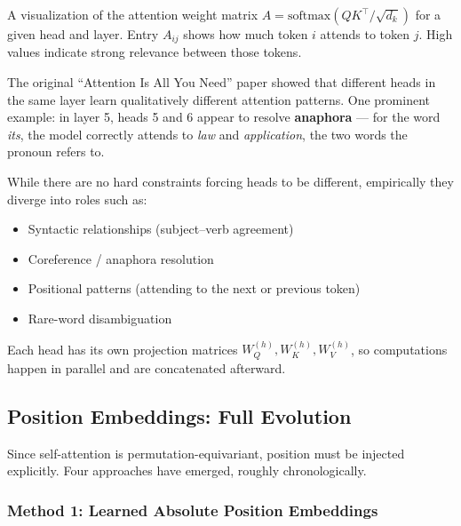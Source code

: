 \documentclass[11pt, a4paper]{article}
\begin{document}
\begin{defbox}
A visualization of the attention weight matrix $A = \text{softmax}(QK^\top / \sqrt{d_k})$ for a given head and layer. Entry $A_{ij}$ shows how much token $i$ attends to token $j$. High values indicate strong relevance between those tokens.
\end{defbox}

The original ``Attention Is All You Need'' paper showed that different heads in the same layer learn qualitatively different attention patterns. One prominent example: in layer 5, heads 5 and 6 appear to resolve \textbf{anaphora} --- for the word \textit{its}, the model correctly attends to \textit{law} and \textit{application}, the two words the pronoun refers to.

\begin{notebox}
While there are no hard constraints forcing heads to be different, empirically they diverge into roles such as:
\begin{itemize}[leftmargin=1.5em]
  \item Syntactic relationships (subject--verb agreement)
  \item Coreference / anaphora resolution
  \item Positional patterns (attending to the next or previous token)
  \item Rare-word disambiguation
\end{itemize}
Each head has its own projection matrices $W_Q^{(h)}, W_K^{(h)}, W_V^{(h)}$, so computations happen in parallel and are concatenated afterward.
\end{notebox}

\subsection{Position Embeddings: Full Evolution}

Since self-attention is permutation-equivariant, position must be injected explicitly. Four approaches have emerged, roughly chronologically.

\subsubsection{Method 1: Learned Absolute Position Embeddings}
\end{document}
